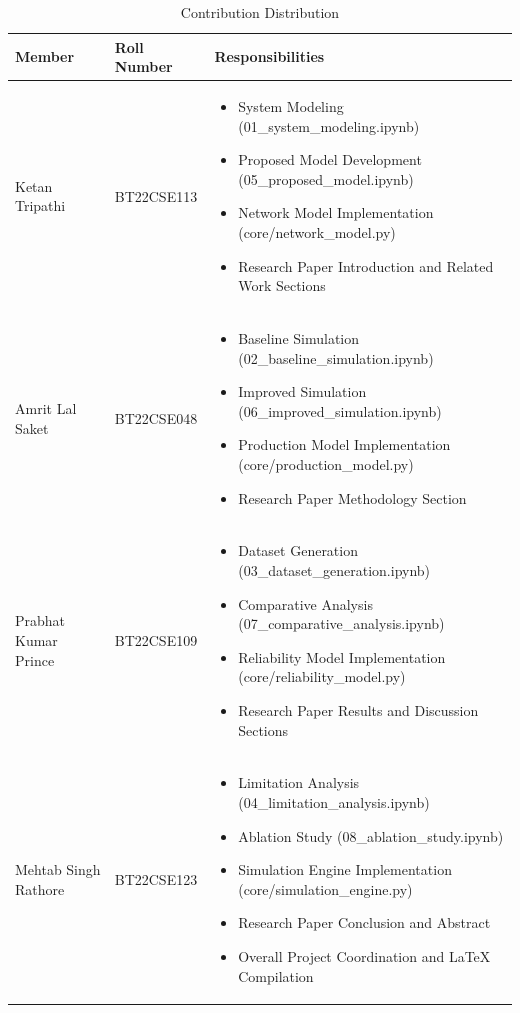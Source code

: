 \documentclass[10pt,a4paper]{article}
\begin{document}
\begin{table}[H]
\centering
\caption{Contribution Distribution}
\label{tab:contributions}
\begin{tabular}{@{}p{}p{}p{}@{}}
\toprule
\textbf{Member} & \textbf{Roll Number} & \textbf{Responsibilities} \\
\midrule
Ketan Tripathi & BT22CSE113 & 
\begin{itemize}[leftmargin=*]
    \item System Modeling (01\_system\_modeling.ipynb)
    \item Proposed Model Development (05\_proposed\_model.ipynb)
    \item Network Model Implementation (core/network\_model.py)
    \item Research Paper Introduction and Related Work Sections
\end{itemize} \\
\midrule
Amrit Lal Saket & BT22CSE048 & 
\begin{itemize}[leftmargin=*]
    \item Baseline Simulation (02\_baseline\_simulation.ipynb)
    \item Improved Simulation (06\_improved\_simulation.ipynb)
    \item Production Model Implementation (core/production\_model.py)
    \item Research Paper Methodology Section
\end{itemize} \\
\midrule
Prabhat Kumar Prince & BT22CSE109 & 
\begin{itemize}[leftmargin=*]
    \item Dataset Generation (03\_dataset\_generation.ipynb)
    \item Comparative Analysis (07\_comparative\_analysis.ipynb)
    \item Reliability Model Implementation (core/reliability\_model.py)
    \item Research Paper Results and Discussion Sections
\end{itemize} \\
\midrule
Mehtab Singh Rathore & BT22CSE123 & 
\begin{itemize}[leftmargin=*]
    \item Limitation Analysis (04\_limitation\_analysis.ipynb)
    \item Ablation Study (08\_ablation\_study.ipynb)
    \item Simulation Engine Implementation (core/simulation\_engine.py)
    \item Research Paper Conclusion and Abstract
    \item Overall Project Coordination and LaTeX Compilation
\end{itemize} \\
\bottomrule
\end{tabular}
\end{table}
\end{document}
